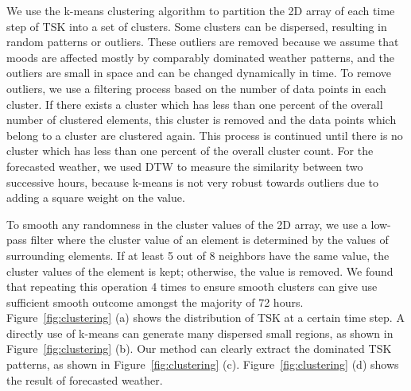 We use the k-means clustering algorithm to partition the 2D array of each time step of TSK into a set of clusters. Some clusters can be dispersed, resulting in random patterns or outliers. These outliers are removed because we assume that moods are affected mostly by comparably dominated weather patterns, and the outliers are small in space and can be changed dynamically in time. To remove outliers, we use a filtering process based on the number of data points in each cluster. If there exists a cluster which has less than one percent of the overall number of clustered elements, this cluster is removed and the data points which belong to a cluster are clustered again. This process is continued until there is no cluster which has less than one percent of the overall cluster count. %
%
For the forecasted weather, we used DTW to measure the similarity between two successive hours, because k-means is not very robust towards outliers due to adding a square weight on the value.

To smooth any randomness in the cluster values of the 2D array, we use a low-pass filter where the cluster value of an element is determined by the values of surrounding elements.
If at least 5 out of 8 neighbors have the same value, the cluster values of the element is kept; otherwise, the value is removed. We found that repeating this operation 4 times to ensure smooth clusters can give use sufficient smooth outcome amongst the majority of 72 hours.
Figure~\ref{fig:clustering} (a) shows the distribution of TSK at a certain time step. A directly use of k-means can generate many dispersed small regions, as shown in Figure~\ref{fig:clustering} (b). Our method can clearly extract the dominated TSK patterns, as shown in Figure~\ref{fig:clustering} (c). Figure~\ref{fig:clustering} (d) shows the result of forecasted weather.

